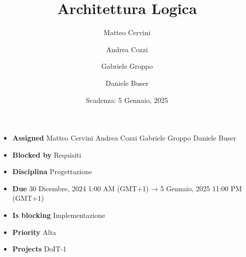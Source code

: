 \title{Architettura Logica}
\author{Matteo Cervini \and Andrea Cozzi \and Gabriele Groppo \and Daniele Buser}
\date{Scadenza: 5 Gennaio, 2025}

\maketitle

\begin{itemize}
    \item \textbf{Assigned} Matteo Cervini Andrea Cozzi Gabriele Groppo Daniele Buser
    \item \textbf{Blocked by} Requisiti
    \item \textbf{Disciplina} Progettazione
    \item \textbf{Due} 30 Dicembre, 2024 1:00 AM (GMT+1) → 5 Gennaio, 2025 11:00 PM (GMT+1)
    \item \textbf{Is blocking} Implementazione
    \item \textbf{Priority} Alta
    \item \textbf{Projects} DoIT-1
\end{itemize}